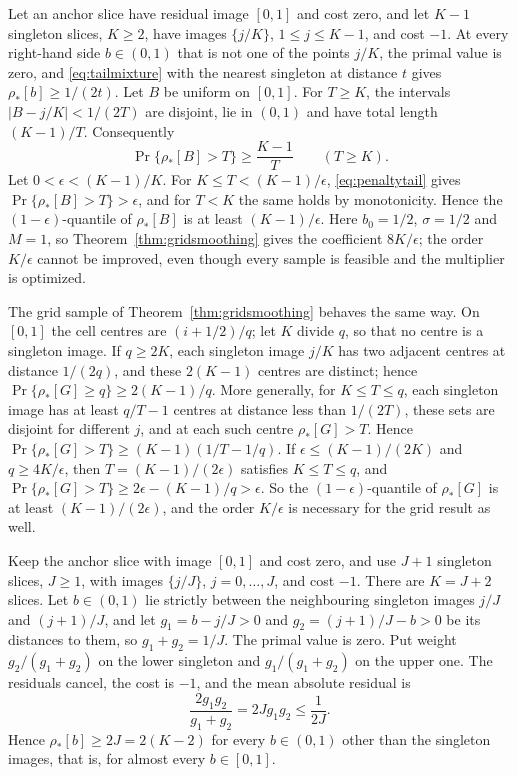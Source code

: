 \begin{example}\label{ex:tail}
Let an anchor slice have residual image $[0,1]$ and cost zero, and let
$K-1$ singleton slices, $K\ge2$, have images $\{j/K\}$,
$1\le j\le K-1$, and cost $-1$. At every right-hand side
$b\in(0,1)$ that is not one of the points $j/K$, the primal value is
zero, and \eqref{eq:tailmixture} with the nearest singleton at distance
$t$ gives $\rho_*[b]\ge1/(2t)$. Let $B$ be uniform on $[0,1]$. For
$T\ge K$, the intervals $|B-j/K|<1/(2T)$ are disjoint, lie in $(0,1)$ and
have total length $(K-1)/T$. Consequently
\begin{equation}\label{eq:penaltytail}
 \Pr\{\rho_*[B]>T\}\ge\frac{K-1}T\qquad(T\ge K).
\end{equation}
Let $0<\epsilon<(K-1)/K$. For $K\le T<(K-1)/\epsilon$,
\eqref{eq:penaltytail} gives $\Pr\{\rho_*[B]>T\}>\epsilon$, and for
$T<K$ the same holds by monotonicity. Hence the $(1-\epsilon)$-quantile
of $\rho_*[B]$ is at least $(K-1)/\epsilon$. Here $b_0=1/2$,
$\sigma=1/2$ and $M=1$, so Theorem~\ref{thm:gridsmoothing} gives the
coefficient $8K/\epsilon$; the order $K/\epsilon$ cannot be improved, even
though every sample is feasible and the multiplier is optimized.

The grid sample of Theorem~\ref{thm:gridsmoothing} behaves the same way.
On $[0,1]$ the cell centres are $(i+1/2)/q$; let $K$ divide $q$, so that
no centre is a singleton image. If $q\ge2K$, each singleton image $j/K$
has two adjacent centres at distance $1/(2q)$, and these $2(K-1)$ centres
are distinct; hence $\Pr\{\rho_*[G]\ge q\}\ge2(K-1)/q$. More generally,
for $K\le T\le q$, each singleton image has at least $q/T-1$ centres at
distance less than $1/(2T)$, these sets are disjoint for different $j$,
and at each such centre $\rho_*[G]>T$. Hence
$\Pr\{\rho_*[G]>T\}\ge(K-1)(1/T-1/q)$. If $\epsilon\le(K-1)/(2K)$ and
$q\ge4K/\epsilon$, then $T=(K-1)/(2\epsilon)$ satisfies $K\le T\le q$, and
$\Pr\{\rho_*[G]>T\}\ge2\epsilon-(K-1)/q>\epsilon$. So the
$(1-\epsilon)$-quantile of $\rho_*[G]$ is at least $(K-1)/(2\epsilon)$,
and the order $K/\epsilon$ is necessary for the grid result as well.
\end{example}

\begin{example}\label{ex:slicecount}
Keep the anchor slice with image $[0,1]$ and cost zero, and use $J+1$
singleton slices, $J\ge1$, with images $\{j/J\}$, $j=0,\ldots,J$, and
cost $-1$. There are $K=J+2$ slices. Let $b\in(0,1)$ lie strictly between
the neighbouring singleton images $j/J$ and $(j+1)/J$, and let
$g_1=b-j/J>0$ and $g_2=(j+1)/J-b>0$ be its distances to them, so
$g_1+g_2=1/J$. The primal value is zero. Put weight $g_2/(g_1+g_2)$ on
the lower singleton and $g_1/(g_1+g_2)$ on the upper one. The residuals
cancel, the cost is $-1$, and the mean absolute residual is
\[
 \frac{2g_1g_2}{g_1+g_2}=2Jg_1g_2\le\frac1{2J}.
\]
Hence $\rho_*[b]\ge2J=2(K-2)$ for every $b\in(0,1)$ other than the
singleton images, that is, for almost every $b\in[0,1]$.
\end{example}

